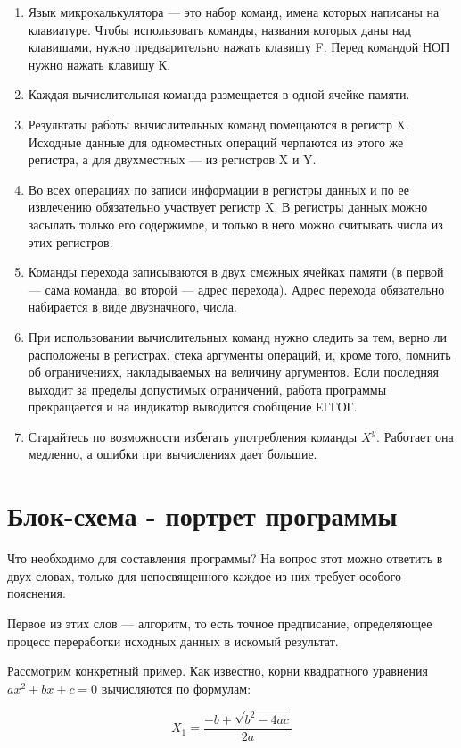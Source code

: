 \documentclass[11pt,a4paper,oneside]{article}
\begin{document}
\begin{enumerate}
\item Язык микрокалькулятора — это набор команд, имена которых написаны на клавиатуре. Чтобы использовать команды, названия которых даны над клавишами, нужно предварительно нажать клавишу F. Перед командой НОП нужно нажать клавишу К.
\item Каждая вычислительная команда размещается в одной ячейке памяти.
\item Результаты работы вычислительных команд помещаются в регистр X. Исходные данные для одноместных операций черпаются из этого же регистра, а для двухместных — из регистров X и Y.
\item Во всех операциях по записи информации в регистры данных и по ее извлечению обязательно участвует регистр X. В регистры данных можно засылать только его содержимое, и только в него можно считывать числа из этих регистров.
\item Команды перехода записываются в двух смежных ячейках памяти (в первой — сама команда, во второй — адрес перехода). Адрес перехода обязательно набирается в виде двузначного, числа.
\item При использовании вычислительных команд нужно следить за тем, верно ли расположены в регистрах, стека аргументы операций, и, кроме того, помнить об ограничениях, накладываемых на величину аргументов. Если последняя выходит за пределы допустимых ограничений, работа программы прекращается и на индикатор выводится сообщение ЕГГОГ.
\item Старайтесь по возможности избегать употребления команды $X^{y}$. Работает она медленно, а ошибки при вычислениях дает большие.
\end{enumerate}

\section{Блок-схема - портрет программы}
Что необходимо для составления программы? На вопрос этот можно ответить в двух словах, только для непосвященного каждое из них требует особого пояснения.

Первое из этих слов — алгоритм, то есть точное предписание, определяющее процесс переработки исходных данных в искомый результат.

Рассмотрим конкретный пример. Как известно, корни квадратного уравнения $ax^{2}+bx+c=0$ вычисляются по формулам:

\begin{equation}
X_{1}=\frac{-b+\sqrt{b^{2}-4ac}}{2a}
\end{equation}
\end{document}
